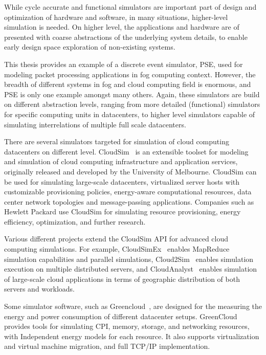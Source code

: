 While cycle accurate and functional simulators are important part of design and optimization of hardware and software, in many situations, higher-level simulation is needed. On higher level, the applications and hardware are of presented with coarse abstractions of the underlying system details, to enable early design space exploration of non-existing systems.

This thesis provides an example of a discrete event simulator, PSE, used for modeling packet processing applications in fog computing context. However, the breadth of different systems in fog and cloud computing field is enormous, and PSE is only one example amongst many others. Again, these simulators are build on different abstraction levels, ranging from more detailed (functional) simulators for specific computing units in datacenters, to higher level simulators capable of simulating interrelations of multiple full scale datacenters.

There are several simulators targeted for simulation of cloud computing datacenters on different level. CloudSim~\cite{Calheiros:2011:Cloudsim} is an extensible toolset for modeling and simulation of cloud computing infrastructure and application services, originally released and developed by the University of Melbourne. CloudSim can be used for simulating large-scale datacenters, virtualized server hosts with customizable provisioning policies, energy-aware computational resources, data center network topologies and message-passing applications. Companies such as Hewlett Packard use CloudSim for simulating resource provisioning, energy efficiency, optimization, and further research.

Various different projects extend the CloudSim API for advanced cloud computing simulations. For example, CloudSimEx~\cite{CloudSimEx} enables MapReduce~\cite{Dean:2008:MR} simulation capabilities and parallel simulations, Cloud2Sim~\cite{Kathiravelu:2014:Concurrent} enables simulation execution on multiple distributed servers, and CloudAnalyst~\cite{Wickremasinghe:2010:CloudAnalyst} enables simulation of large-scale cloud applications in terms of geographic distribution of both servers and workloads.

Some simulator software, such as Greencloud~\cite{Kliazovich:2010:GreenCloud}, are designed for the measuring the energy and power consumption of different datacenter setups. GreenCloud provides tools for simulating CPI, memory, storage, and networking resources, with Independent energy models for each resource. It also supports virtualization and virtual machine migration, and full TCP/IP implementation.

